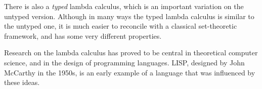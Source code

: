 \documentclass[../../../include/open-logic-section]{subfiles}
\begin{document}
\begin{digress}
There is also a \emph{typed} lambda calculus, which is an important
variation on the untyped version. Although in many ways the typed
lambda calculus is similar to the untyped one, it is much easier to
reconcile with a classical set-theoretic framework, and has some very
different properties.

Research on the lambda calculus has proved to be central in
theoretical computer science, and in the design of programming
languages. LISP, designed by John McCarthy in the 1950s, is an early
example of a language that was influenced by these ideas.
\end{digress}
\end{document}
